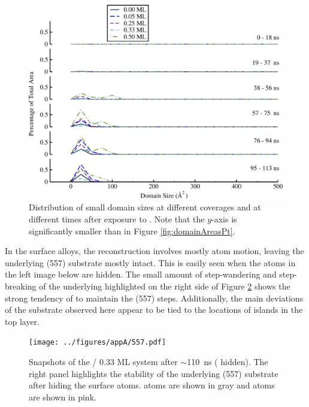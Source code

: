 \begin{figure}
  \centering
  \includegraphics[width=\linewidth]{../figures/appA/domainSizes_Pt_SI_smallFocus.pdf}
  \caption{Distribution of small  domain sizes at different
     coverages and at different times after exposure to
    . Note that the $y$-axis is significantly smaller than in
    Figure \ref{fig:domainAreasPt}.}
\label{fig:Pt_SI_small}
\end{figure}
\newpage




In the surface alloys, the reconstruction involves mostly  atom
motion, leaving the underlying (557) substrate mostly intact.
This is easily seen when the  atoms in the left image below are
hidden.  The small amount of step-wandering and step-breaking of the
underlying  highlighted on the right side of Figure \ref{fig:557}
shows the strong tendency of  to maintain the (557) steps.
Additionally, the main deviations of the  substrate observed
here appear to be tied to the locations of islands in the  top
layer.

\begin{figure}
  \texttt{[image: ../figures/appA/557.pdf]}
  \caption{Snapshots of the / 0.33 ML system after
    $\sim$110~ns ( hidden). The right panel highlights the
    stability of the underlying (557)  substrate after hiding
    the surface  atoms.  atoms are shown in gray and
     atoms are shown in pink.}
\label{fig:557}
\end{figure}
\newpage

